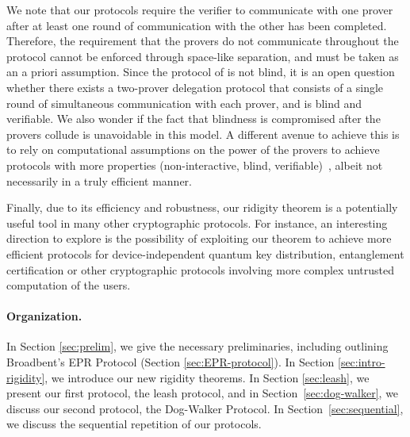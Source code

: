 \documentclass[11pt]{article}
\begin{document}
We note that our protocols require the verifier to communicate with one
prover after at least one round of communication with the other has been
completed. Therefore, the requirement that the provers do not
communicate throughout the protocol cannot be enforced through space-like
separation, and must be taken as an a priori assumption.
Since the protocol of \cite{Grilo17} is not blind, it is an open question
whether there exists a two-prover
delegation protocol that consists of a single round of simultaneous
communication with each prover, and is blind and verifiable. 
We also wonder if the fact that blindness is compromised after the provers
collude is unavoidable in this model.
A different
avenue to achieve this is to rely on computational assumptions on the power of
the provers to achieve protocols with more properties (non-interactive, blind,
verifiable)~\cite{dulek16,alagic2017quantum,mahadev2017,mahadev2018}, albeit not
necessarily in a truly efficient manner.

Finally, due to its efficiency and robustness, our ridigity theorem is a
potentially useful tool in many other cryptographic protocols. For instance, an
interesting direction to explore is the possibility of exploiting our theorem to
achieve more efficient protocols for device-independent quantum key
distribution, entanglement certification or other cryptographic protocols
involving more complex untrusted computation of the users.




\paragraph{Organization.}
In Section \ref{sec:prelim}, we give the necessary preliminaries, including
outlining Broadbent's EPR Protocol (Section \ref{sec:EPR-protocol}). In Section
\ref{sec:intro-rigidity}, we introduce our new rigidity theorems. In Section
\ref{sec:leash}, we present our first protocol, the leash protocol, and in
Section~\ref{sec:dog-walker}, we discuss our second protocol, the
Dog-Walker Protocol. In Section~\ref{sec:sequential}, we discuss the sequential repetition of our protocols.
\end{document}
